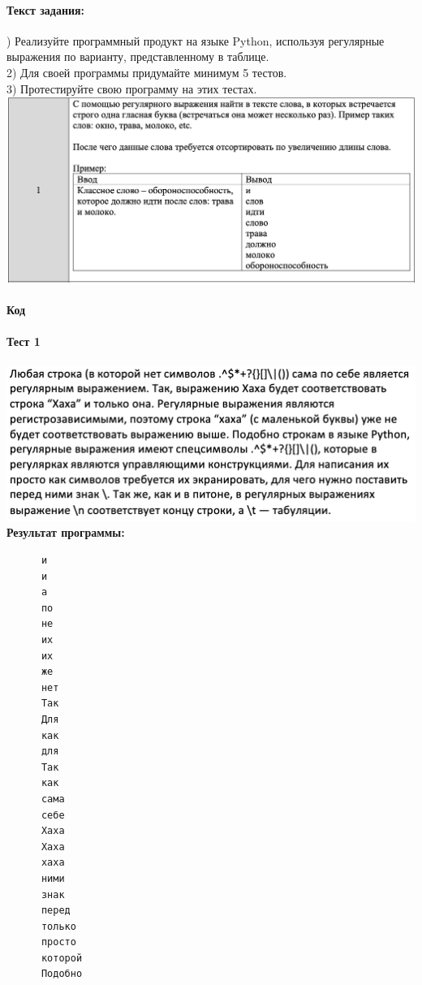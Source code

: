 \documentclass[12pt,onecolumn]{article}
\begin{document}
\begin{flushleft}
\paragraph{Текст задания:}
\hfill {}) Реализуйте программный продукт на языке Python, используя регулярные выражения по варианту, представленному в таблице.\\
2) Для своей программы придумайте минимум 5 тестов.\\
3) Протестируйте свою программу на этих тестах.\\
\includegraphics[scale=0.5]{images/no3.png}
\paragraph{Код}
\hfill \break
\FloatBarrier
\begingroup
    \fontsize{10pt}{12pt}\selectfont
      
\endgroup
\hfill \break
\paragraph{Тест 1}
\hfill \break
\includegraphics[scale=0.5]{prog3/p1.png}\\
\textbf{Результат программы:}\\
\begingroup
    \fontsize{10pt}{12pt}\selectfont
    \begin{verbatim}  
      и
      и
      а
      по
      не
      их
      их
      же
      нет
      Так
      Для
      как
      для
      Так
      как
      сама
      себе
      Хаха
      Хаха
      хаха
      ними
      знак
      перед
      только
      просто
      которой
      Подобно
    \end{verbatim}  
\endgroup

\end{flushleft}
\end{document}
